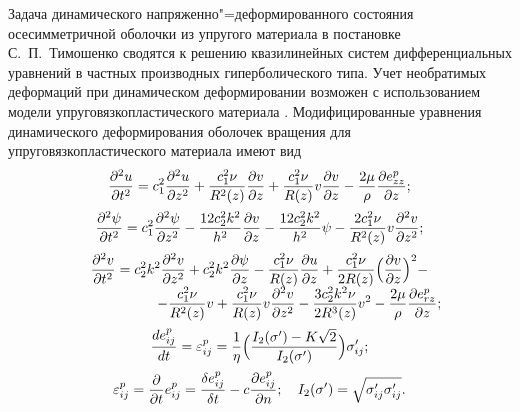 \date{}

\renewcommand{\JournalDataOnline}{\displaydate{verveikoe}}


\vspace{-3mm}


\renewcommand{\baselinestretch}{0.88}

\makerutitle


Задача динамического напряженно"=деформированного состояния осесимметричной оболочки из упругого материала в постановке С.~П.~Тимошенко \cite{ver:bib1,ver:bib2} сводятся к решению квазилинейных систем дифференциальных уравнений в частных производных гиперболического типа. Учет необратимых деформаций при динамическом деформировании возможен с использованием модели упруговязкопластического материала \cite{ver:bib3}. Модифицированные уравнения динамического деформирования оболочек вращения \cite{ver:bib10} для упруговязкопластического материала имеют вид
\begin{equation}
\label{ver:eq1}
\begin{array}{c}
\displaystyle
\frac{\partial^2 u}{\partial t^2}=c_1^2\frac{\partial^2 u}{\partial z^2}+\frac{c_1^2\nu}{R^2(z)}\frac{\partial v}{\partial z}+\frac{c_1^2\nu}{R(z)}v\frac{\partial v}{\partial z}-\frac{2\mu}{\rho}\frac{\partial e_{zz}^p}{\partial z};
\\[4mm]
\displaystyle
\frac{\partial^2\psi}{\partial t^2}=c_1^2\frac{\partial^2\psi}{\partial z^2}-\frac{12c_2^2k^2}{h^2}\frac{\partial v}{\partial z}-\frac{12c_2^2k^2}{h^2}\psi-\frac{2c_1^2\nu}{R^2(z)}v\frac{\partial^2 v}{\partial z^2};
\\[4mm]
\displaystyle
\frac{\partial^2v}{\partial t^2}=c_2^2k^2\frac{\partial^2v}{\partial z^2}+c_2^2k^2 \frac{\partial\psi}{\partial z}-\frac{c_1^2\nu}{R(z)}\frac{\partial u}{\partial z}+\frac{c_1^2\nu}{2R(z)}\Bigl(\frac{\partial v}{\partial z}\Bigr)^2-
\\[2mm]
\displaystyle \hspace{2cm}
-\frac{c_1^2\nu}{R^2(z)}v+\frac{c_1^2\nu}{R(z)}v\frac{\partial^2v}{\partial z^2}-\frac{3c_2^2k^2\nu}{2R^3(z)}v^2-\frac{2\mu}{\rho}\frac{\partial e_{rz}^p}{\partial z};
\\[4mm]
\displaystyle
\frac{d e_{ij}^p}{d t}=\varepsilon_{ij}^p=\frac{1}{\eta}\Bigl(\frac{I_2(\sigma')-K\sqrt{2}}{I_2(\sigma')}\Bigr)\sigma'_{ij};
\\[4mm]
\displaystyle
\varepsilon^p_{ij}=\frac{\partial}{\partial t}e^p_{ij}=\frac{\delta e_{ij}^p}{\delta t}-c\frac{\partial e_{ij}^p}{\partial n};
\quad
I_{2}(\sigma')=\sqrt{\sigma_{ij}' \sigma_{ij}'}.
\end{array}
\end{equation}
